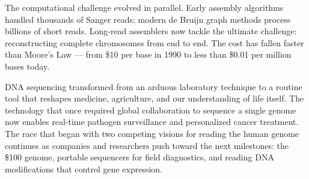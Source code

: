 \begin{historical}
The computational challenge evolved in parallel. Early assembly algorithms handled thousands of Sanger reads; modern de Bruijn graph methods process billions of short reads. Long-read assemblers now tackle the ultimate challenge: reconstructing complete chromosomes from end to end. The cost has fallen faster than Moore's Law — from \$10 per base in 1990 to less than \$0.01 per million bases today.

DNA sequencing transformed from an arduous laboratory technique to a routine tool that reshapes medicine, agriculture, and our understanding of life itself. The technology that once required global collaboration to sequence a single genome now enables real-time pathogen surveillance and personalized cancer treatment. The race that began with two competing visions for reading the human genome continues as companies and researchers push toward the next milestones: the \$100 genome, portable sequencers for field diagnostics, and reading DNA modifications that control gene expression.
\end{historical}
